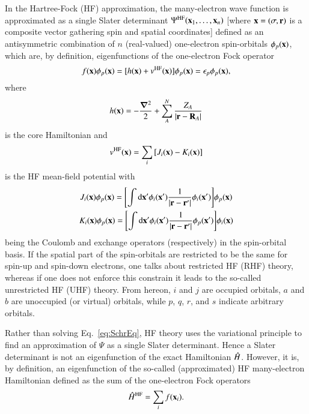 \documentclass[aps,prb,reprint,noshowkeys,superscriptaddress]{revtex4-1}
\newcommand{\hH}{\Hat{H}}
\begin{document}
In the Hartree-Fock (HF) approximation, the many-electron wave function is approximated as a single Slater determinant $\Psi^{\text{HF}}(\vb{x}_1,\ldots,\vb{x}_n)$ [where $\vb{x} = (\sigma,\vb{r})$ is a composite vector gathering spin and spatial coordinates] defined as an antisymmetric combination of $n$ (real-valued) one-electron spin-orbitals $\phi_p(\vb{x})$, which are, by definition, eigenfunctions of the one-electron Fock operator 
\begin{equation}\label{eq:FockOp}
	f(\vb{x}) \phi_p(\vb{x}) = [ h(\vb{x}) + v^\text{HF}(\vb{x}) ] \phi_p(\vb{x}) = \epsilon_p \phi_p(\vb{x}),
\end{equation}
where 
\begin{equation}
	h(\vb{x}) = -\frac{\grad^2}{2} + \sum_{A}^{N} \frac{Z_A}{\abs{\vb{r}-\vb{R}_A}}
\end{equation}
is the core Hamiltonian and 
\begin{equation}
	v^\text{HF}(\vb{x}) = \sum_i \qty[ J_i(\vb{x}) - K_i(\vb{x}) ]
\end{equation}
is the HF mean-field potential with 
\begin{subequations}
\begin{gather}
	\label{eq:CoulOp}
	J_i(\vb{x})\phi_p(\vb{x})=\qty[\int\dd\vb{x}'\phi_i(\vb{x}')\frac{1}{\abs{\vb{r} - \vb{r}'}}\phi_i(\vb{x}') ] \phi_p(\vb{x})
	\\
	\label{eq:ExcOp}
	K_i(\vb{x})\phi_p(\vb{x})=\qty[\int\dd\vb{x}'\phi_i(\vb{x}')\frac{1}{\abs{\vb{r} - \vb{r}'}}\phi_p(\vb{x}') ] \phi_i(\vb{x})
\end{gather}
\end{subequations}
being the Coulomb and exchange operators (respectively) in the spin-orbital basis. \cite{SzaboBook}
If the spatial part of the spin-orbitals are restricted to be the same for spin-up and spin-down electrons, one talks about restricted HF (RHF) theory, whereas if one does not enforce this constrain it leads to the so-called unrestricted HF (UHF) theory. 
From hereon, $i$ and $j$ are occupied orbitals, $a$ and $b$ are unoccupied (or virtual) orbitals, while $p$, $q$, $r$, and $s$ indicate arbitrary orbitals.

Rather than solving Eq.~\eqref{eq:SchrEq}, HF theory uses the variational principle to find an approximation of $\Psi$ as a single Slater determinant. Hence a Slater determinant is not an eigenfunction of the exact Hamiltonian $\hH$. However, it is, by definition, an eigenfunction of the so-called (approximated) HF many-electron Hamiltonian defined as the sum of the one-electron Fock operators
\begin{equation}\label{eq:HFHamiltonian}
	\hH^{\text{HF}} = \sum_{i} f(\vb{x}_i).
\end{equation}
\end{document}
